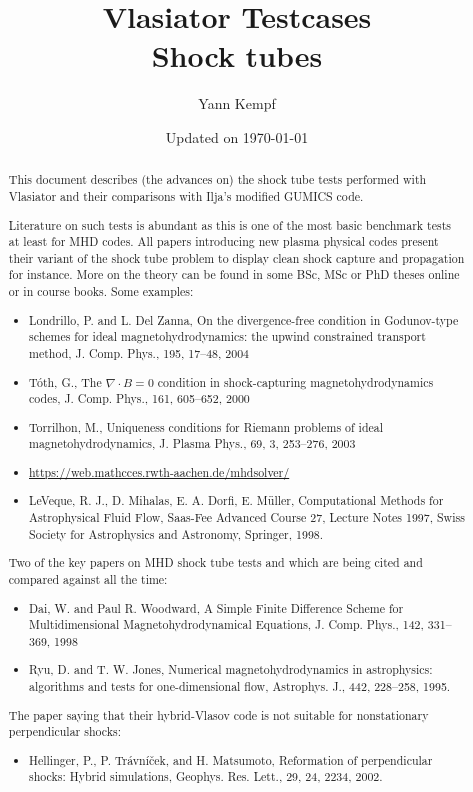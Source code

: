 \documentclass[a4paper,10pt]{scrartcl}
\title{
\Huge{Vlasiator Testcases} \\
\LARGE{Shock tubes}
}
\author{Yann Kempf}
\date{Updated on \today}
\begin{document}
\maketitle

\begin{abstract}
This document describes (the advances on) the shock tube tests performed with Vlasiator and their comparisons with Ilja's modified GUMICS code.

Literature on such tests is abundant as this is one of the most basic benchmark tests at least for MHD codes. All papers introducing new plasma physical codes present their variant of the shock tube problem to display clean shock capture and propagation for instance. More on the theory can be found in some BSc, MSc or PhD theses online or in course books. Some examples:
\begin{itemize}
 \item Londrillo, P. and L. Del Zanna, On the divergence-free condition in Godunov-type schemes for ideal magnetohydrodynamics: the upwind constrained transport method, J. Comp. Phys., 195, 17--48, 2004
 \item Tóth, G., The $\nabla \cdot B = 0$ condition in shock-capturing magnetohydrodynamics codes, J. Comp. Phys., 161, 605--652, 2000
 \item Torrilhon, M., Uniqueness conditions for Riemann problems of ideal magnetohydrodynamics, J. Plasma Phys., 69, 3, 253--276, 2003
 \item \url{https://web.mathcces.rwth-aachen.de/mhdsolver/}
 \item LeVeque, R. J., D. Mihalas, E. A. Dorfi, E. Müller, Computational Methods for Astrophysical Fluid Flow, Saas-Fee Advanced Course 27, Lecture Notes 1997, Swiss Society for Astrophysics and Astronomy, Springer, 1998.
\end{itemize}

Two of the key papers on MHD shock tube tests and which are being cited and compared against all the time:
\begin{itemize}
 \item Dai, W. and Paul R. Woodward, A Simple Finite Difference Scheme for Multidimensional Magnetohydrodynamical Equations, J. Comp. Phys., 142, 331--369, 1998
 \item Ryu, D. and T. W. Jones, Numerical magnetohydrodynamics in astrophysics: algorithms and tests for one-dimensional flow, Astrophys. J., 442, 228--258, 1995.
\end{itemize}

The paper saying that their hybrid-Vlasov code is not suitable for nonstationary perpendicular shocks:
\begin{itemize}
 \item Hellinger, P., P. Trávníček, and H. Matsumoto, Reformation of perpendicular shocks: Hybrid simulations, Geophys. Res. Lett., 29, 24, 2234, 2002.
\end{itemize}


\end{abstract}
\end{document}
